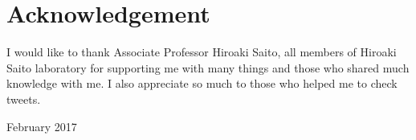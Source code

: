 \chapter*{Acknowledgement}
I would like to thank Associate Professor Hiroaki Saito, all members of Hiroaki Saito laboratory for supporting me with many things and those who shared much knowledge with me.
I also appreciate so much to those who helped me to check tweets.
\begin{flushright}
 February  2017
\end{flushright}

